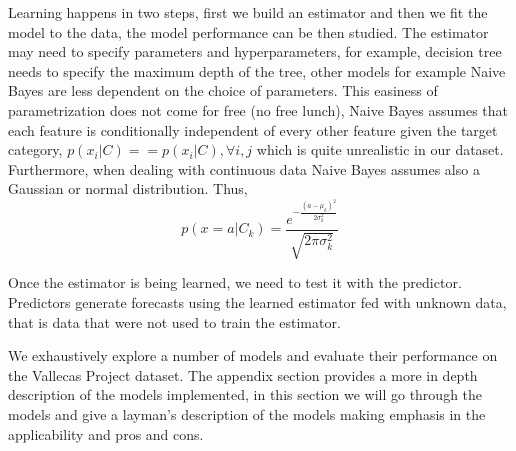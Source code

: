 \documentclass[11pt]{article}
\begin{document}
Learning happens in two steps, first we build an estimator and then we fit the model to the data, the model performance can be then studied. The estimator may need to specify parameters and hyperparameters, for example, decision tree needs to specify the maximum depth of the tree, other models for example Naive Bayes are less dependent on the choice of parameters. 
This easiness of parametrization does not come for free (no free lunch), Naive Bayes assumes that each feature is conditionally independent of every other feature given the target category, $p(x_i|C) == p(x_i|C), \forall i,j$ which is quite unrealistic in our dataset. Furthermore, when dealing with continuous data Naive Bayes assumes also a Gaussian or normal distribution. Thus, 
\begin{equation}
p(x = a|C_k) = \frac{e^{-\frac{(a-\mu_k)^2}{2\sigma_k^{2}}}} {\sqrt{2\pi\sigma_k^{2}}}
\label{eq:gauss}
\end{equation}

Once the estimator is being learned, we need to test it with the predictor. Predictors generate forecasts using the learned estimator fed with unknown  data, that is data that were not used to train the estimator.

We exhaustively explore a number of models and evaluate their performance on the Vallecas Project dataset.
The appendix section provides a more in depth description of the models implemented, in this section we will
go through the models and give a layman's description of the models making emphasis in the applicability and pros and cons.
\end{document}
